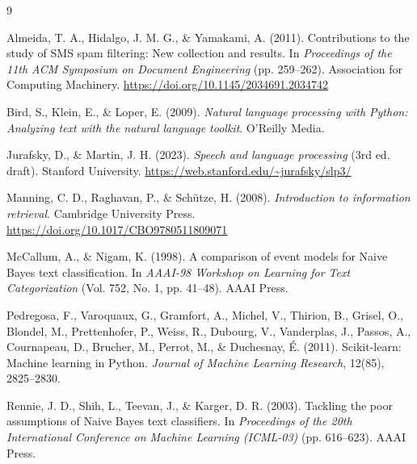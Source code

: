 \documentclass[12pt,a4paper]{report}
\begin{document}
\begin{thebibliography}{9}

Almeida, T. A., Hidalgo, J. M. G., \& Yamakami, A. (2011). Contributions to the study of SMS spam filtering: New collection and results. In \textit{Proceedings of the 11th ACM Symposium on Document Engineering} (pp. 259--262). Association for Computing Machinery. \url{https://doi.org/10.1145/2034691.2034742}

Bird, S., Klein, E., \& Loper, E. (2009). \textit{Natural language processing with Python: Analyzing text with the natural language toolkit}. O'Reilly Media.

Jurafsky, D., \& Martin, J. H. (2023). \textit{Speech and language processing} (3rd ed. draft). Stanford University. \url{https://web.stanford.edu/~jurafsky/slp3/}

Manning, C. D., Raghavan, P., \& Schütze, H. (2008). \textit{Introduction to information retrieval}. Cambridge University Press. \url{https://doi.org/10.1017/CBO9780511809071}

McCallum, A., \& Nigam, K. (1998). A comparison of event models for Naive Bayes text classification. In \textit{AAAI-98 Workshop on Learning for Text Categorization} (Vol. 752, No. 1, pp. 41--48). AAAI Press.

Pedregosa, F., Varoquaux, G., Gramfort, A., Michel, V., Thirion, B., Grisel, O., Blondel, M., Prettenhofer, P., Weiss, R., Dubourg, V., Vanderplas, J., Passos, A., Cournapeau, D., Brucher, M., Perrot, M., \& Duchesnay, É. (2011). Scikit-learn: Machine learning in Python. \textit{Journal of Machine Learning Research}, 12(85), 2825--2830.

Rennie, J. D., Shih, L., Teevan, J., \& Karger, D. R. (2003). Tackling the poor assumptions of Naive Bayes text classifiers. In \textit{Proceedings of the 20th International Conference on Machine Learning (ICML-03)} (pp. 616--623). AAAI Press.

\end{thebibliography}

\appendix
\end{document}
